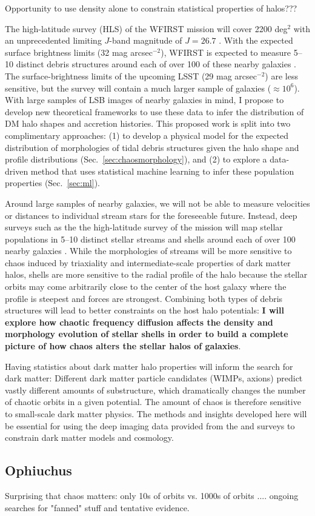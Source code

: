 Opportunity to use density alone to constrain statistical properties of halos???

The high-latitude survey (HLS) of the WFIRST mission will cover 2200 deg$^2$ with an unprecedented limiting $J$-band magnitude of $J=26.7$ \citep{spergel15}. With the expected surface brightness limits (32 mag arcsec$^{-2}$), WFIRST is expected to measure 5--10 distinct debris structures around each of over 100 of these nearby galaxies \citep{johnston08}. The surface-brightness limits of the upcoming LSST (29 mag arcsec$^{-2}$) are less sensitive, but the survey will contain a much larger sample of galaxies ($\approx$$10^6$). With large samples of LSB images of nearby galaxies in mind, I propose to develop new theoretical frameworks to use these data to infer the distribution of DM halo shapes and accretion histories. This proposed work is split into two complimentary approaches: (1) to develop a physical model for the expected distribution of morphologies of tidal debris structures given the halo shape and profile distributions (Sec.~\ref{sec:chaosmorphology}), and (2) to explore a data-driven method that uses statistical machine learning to infer these population properties (Sec.~\ref{sec:ml}).

Around large samples of nearby galaxies, we will not be able to measure velocities or distances to individual stream stars for the foreseeable future. Instead, deep surveys such as the the high-latitude survey of the  mission will map stellar populations in 5--10 distinct stellar streams and shells around each of over 100 nearby galaxies \citep{johnston08,spergel15}. While the morphologies of streams will be more sensitive to chaos induced by triaxiality and intermediate-scale properties of dark matter halos, shells are more sensitive to the radial profile of the halo because the stellar orbits may come arbitrarily close to the center of the host galaxy where the profile is steepest and forces are strongest. Combining both types of debris structures will lead to better constraints on the host halo potentials: {\bf I will explore how chaotic frequency diffusion affects the density and morphology evolution of stellar shells in order to build a complete picture of how chaos alters the stellar halos of galaxies}.

Having statistics about dark matter halo properties will inform the search for dark matter: Different dark matter particle candidates (WIMPs, axions) predict vastly different amounts of substructure, which dramatically changes the number of chaotic orbits in a given potential. The amount of chaos is therefore sensitive to small-scale dark matter physics. The methods and insights developed here will be essential for using the deep imaging data provided from the  and  surveys to constrain dark matter models and cosmology.

\subsection{Ophiuchus}

Surprising that chaos matters: only 10s of orbits vs. 1000s of orbits .... ongoing searches for "fanned" stuff and tentative evidence.